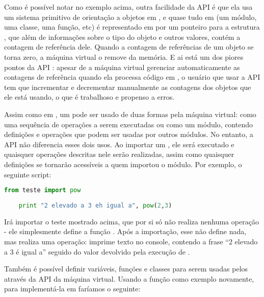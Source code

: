     \vspace{1em}
    
    Como é possível notar no exemplo acima, outra facilidade da API é que ela usa um sistema 
    primitivo de orientação a objetos em \C{}, e quase tudo em  (um módulo, uma 
    classe, uma função, etc) é representado em \C{} por um ponteiro para a estrutura , 
    que além de informações sobre o tipo do objeto e outros valores, contém a contagem de 
    referência dele. Quando a contagem de referências de um objeto se torna zero, a 
    máquina virtual o remove da memória. E ai está um dos piores pontos da API : 
    apesar de a máquina virtual gerenciar automaticamente as contagens de referência
    quando ela processa código em , o usuário que usar a API \C{} tem que incrementar e 
    decrementar manualmente as contagens dos objetos que ele está usando, o que é trabalhoso e 
    propenso a erros.
    
    Assim como em , um \script{} pode ser usado de duas formas pela máquina virtual:
    como uma sequência de operações a serem executadas ou como um módulo, contendo definições
    e operações que podem ser usadas por outros módulos. No entanto, a API  não
    diferencia esses dois usos. Ao importar um \script{} , ele será executado
    e quaisquer operações descritas nele serão realizadas, assim como quaisquer definições
    se tornarão acessíveis a quem importou o módulo. Por exemplo, o seguinte script:
    \vspace{1em}
    \begin{lstlisting}[language=python]
    from teste import pow
    
    print "2 elevado a 3 eh igual a", pow(2,3)
    \end{lstlisting}
    \vspace{1em}
    Irá importar o \script{} teste mostrado acima, que por si só não realiza nenhuma operação -
    ele simplesmente define a função . Após a importação, esse \script{} não
    define nada, mas realiza uma operação: imprime texto no console, contendo a frase
    ``2 elevado a 3 é igual a'' seguido do valor devolvido pela execução de .
    
    Também é possível definir variáveis, funções e classes para serem usadas pelos 
    através da API da máquina virtual. Usando a função  como exemplo novamente,
    para implementá-la em \C{} faríamos o seguinte:
    
